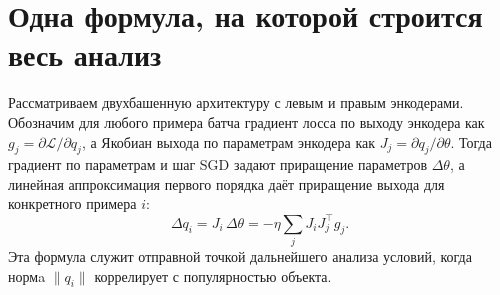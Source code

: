 \section{Одна формула, на которой строится весь анализ}
Рассматриваем двухбашенную архитектуру с левым и правым энкодерами. Обозначим для любого примера батча градиент лосса по выходу энкодера как \(g_j = \partial \mathcal{L}/\partial q_j\), а Якобиан выхода по параметрам энкодера как \(J_j = \partial q_j/\partial \theta\). Тогда градиент по параметрам и шаг SGD задают приращение параметров \(\Delta\theta\), а линейная аппроксимация первого порядка даёт приращение выхода для конкретного примера \(i\):
\[
\Delta q_i = J_i\,\Delta\theta = -\eta\sum_j J_i J_j^{\top} g_j.
\]
Эта формула служит отправной точкой дальнейшего анализа условий, когда нормa \(\|q_i\|\) коррелирует с популярностью объекта.

